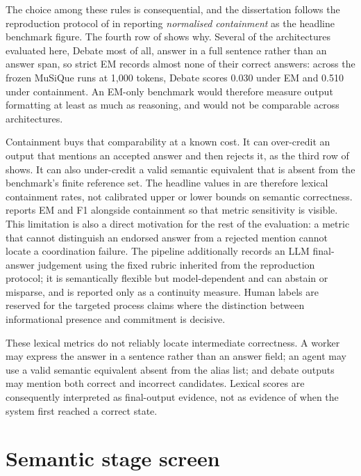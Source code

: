 The choice among these rules is consequential, and the dissertation follows the reproduction protocol of \citet{tran2026single} in reporting \emph{normalised containment} as the headline benchmark figure. The fourth row of  shows why. Several of the architectures evaluated here, Debate most of all, answer in a full sentence rather than an answer span, so strict EM records almost none of their correct answers: across the frozen MuSiQue runs at 1,000 tokens, Debate scores 0.030 under EM and 0.510 under containment. An EM-only benchmark would therefore measure output formatting at least as much as reasoning, and would not be comparable across architectures.

Containment buys that comparability at a known cost. It can over-credit an output that mentions an accepted answer and then rejects it, as the third row of  shows. It can also under-credit a valid semantic equivalent that is absent from the benchmark's finite reference set. The headline values in  are therefore lexical containment rates, not calibrated upper or lower bounds on semantic correctness.  reports EM and F1 alongside containment so that metric sensitivity is visible. This limitation is also a direct motivation for the rest of the evaluation: a metric that cannot distinguish an endorsed answer from a rejected mention cannot locate a coordination failure. The pipeline additionally records an LLM final-answer judgement using the fixed rubric inherited from the reproduction protocol; it is semantically flexible but model-dependent and can abstain or misparse, and is reported only as a continuity measure. Human labels are reserved for the targeted process claims where the distinction between informational presence and commitment is decisive.

These lexical metrics do not reliably locate intermediate correctness. A worker may express the answer in a sentence rather than an answer field; an agent may use a valid semantic equivalent absent from the alias list; and debate outputs may mention both correct and incorrect candidates. Lexical scores are consequently interpreted as final-output evidence, not as evidence of when the system first reached a correct state.

\section{Semantic stage screen}

